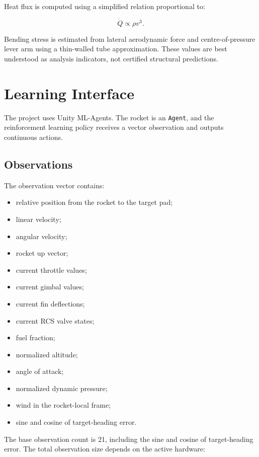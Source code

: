 \documentclass[12pt,a4paper]{article}
\begin{document}
Heat flux is computed using a simplified relation proportional to:

\begin{equation}
\dot{Q} \propto \rho v^3.
\end{equation}

Bending stress is estimated from lateral aerodynamic force and centre-of-pressure lever arm using a thin-walled tube approximation. These values are best understood as analysis indicators, not certified structural predictions.

\section{Learning Interface}

The project uses Unity ML-Agents. The rocket is an \texttt{Agent}, and the reinforcement learning policy receives a vector observation and outputs continuous actions.

\subsection{Observations}

The observation vector contains:

\begin{itemize}
    \item relative position from the rocket to the target pad;
    \item linear velocity;
    \item angular velocity;
    \item rocket up vector;
    \item current throttle values;
    \item current gimbal values;
    \item current fin deflections;
    \item current RCS valve states;
    \item fuel fraction;
    \item normalized altitude;
    \item angle of attack;
    \item normalized dynamic pressure;
    \item wind in the rocket-local frame;
    \item sine and cosine of target-heading error.
\end{itemize}

The base observation count is 21, including the sine and cosine of target-heading error. The total observation size depends on the active hardware:
\end{document}

